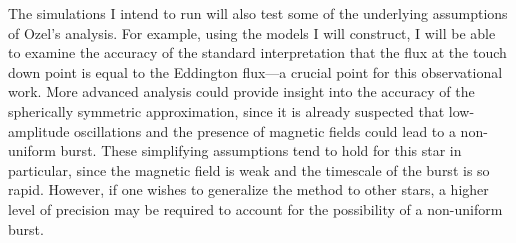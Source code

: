 \documentclass[onecolumn]{aastex63}
\begin{document}
The simulations I intend to run will also test some of the underlying assumptions of Ozel's analysis. For example, using the models I will construct, I will be able to examine the accuracy of the standard interpretation that the flux at the touch down point is equal to the Eddington flux---a crucial point for this observational work. More advanced analysis could provide insight into the accuracy of the spherically symmetric approximation, since it is already suspected that low-amplitude oscillations and the presence of magnetic fields could lead to a non-uniform burst. These simplifying assumptions tend to hold for this star in particular, since the magnetic field is weak and the timescale of the burst is so rapid. However, if one wishes to generalize the method to other stars, a higher level of precision may be required to account for the possibility of a non-uniform burst.

{}

\end{document}
